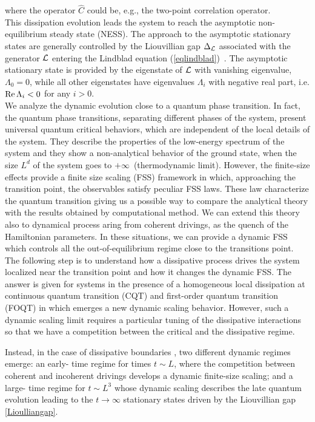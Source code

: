 {where the operator $\hat{C}$ could be, e.g., the two-point
correlation operator.\\
This dissipation evolution leads the system to reach the 
asymptotic non-equilibrium steady state (NESS).
The approach to the asymptotic stationary states are generally
controlled by the Liouvillian gap $\Delta_{\cal L}$ associated with
the generator ${\cal L}$ entering the Lindblad equation
(\ref{eqlindblad})~\cite{BP-openquantumsystembook,RH-book,Z-2015-relaxtimes,MBBC-18,KS-2020-boundarydephasing}.
The asymptotic stationary state is provided by the eigenstate of
${\cal L}$ with vanishing eigenvalue, $\Lambda_0=0$, while all other
eigenstates have eigenvalues $\Lambda_i$ with negative real part,
i.e. ${\rm Re}\,\Lambda_i<0$ for any $i>0$.
}\\

We analyze the dynamic evolution close to a quantum phase transition. In fact, the quantum phase transitions, separating different phases of the system, present universal quantum critical behaviors, which are independent of the local details of the system. They describe the properties of the low-energy spectrum of the system and they show a non-analytical behavior of the ground state, when the size $L^d$ of the system goes to $+\infty\,$ (thermodynamic limit). However, the finite-size effects provide a finite size scaling (FSS) framework in which, approaching the transition point, the observables satisfy peculiar FSS laws. These law characterize the quantum transition giving us a possible way to compare the analytical theory with the results obtained by computational method. We can extend this theory also to dynamical process aring from coherent drivings, as the quench of the Hamiltonian parameters. In these situations, we can provide a dynamic FSS which controls all the out-of-equilibrium regime close to the transitions point. The following step is to understand how a dissipative process drives the system localized near the transition point and how it changes the dynamic FSS. The answer is given for systems in the presence of a homogeneous local dissipation at continuous quantum transition (CQT) \cite{NRV-2019-competingdissipativeandcoherent} and first-order quantum transition (FOQT) \cite{di2020dissipative} in which emerges a new dynamic scaling behavior. However, such a dynamic scaling limit requires a particular tuning of the dissipative interactions so that we have a competition between the critical and the dissipative regime. 

Instead, in the case of dissipative boundaries 
\cite{TV-2021-dissipativeboundaries}, two different dynamic regimes emerge: an early-
time regime for times $t \sim L$, where the competition between coherent and incoherent drivings
develops a dynamic finite-size scaling; and a large-
time regime for $t \sim L^3$ whose dynamic scaling describes the late quantum evolution leading to the
$t \to \infty$ stationary states driven by the Liouvillian gap \eqref{Lioulliangap}.

